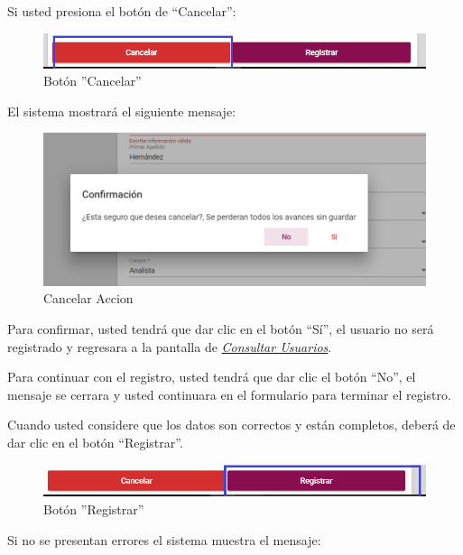     \newpage
            Si usted presiona el botón de “Cancelar”:

            \begin{figure}[!hbtp]
                \centering
                \hypertarget{cancel1}{\includegraphics[width=0.7\linewidth]{images/SP5/BtnCancelar1}}
                \caption{Botón ''Cancelar''}
                \label{cancel1}
            \end{figure}

            El sistema mostrará el siguiente mensaje:


             \begin{figure}[!hbtp]
            	\centering
            \includegraphics[width=0.4\linewidth]{images/SP5/MSG29}
            	\caption{Cancelar Accion}
            	\label{mensaje29}
            \end{figure}

            Para confirmar, usted tendrá que dar clic en el botón “Sí”, el usuario no será registrado y regresara a la pantalla de \hyperlink{consultarUs}{\textit{Consultar Usuarios}}.

            Para continuar con el registro, usted tendrá que  dar clic el botón “No”, el mensaje se cerrara y usted continuara en el formulario para terminar el registro.

            Cuando usted considere que los datos son correctos y están completos, deberá de dar clic en el botón “Registrar”.

            \begin{figure}[!hbtp]
                \centering
                \hypertarget{btnreg}{\includegraphics[width=0.7\linewidth]{images/SP5/BtnRegistrar}}
                \caption{Botón ''Registrar''}
                \label{btnreg}
            \end{figure}

            Si no se presentan errores el sistema muestra el mensaje:


